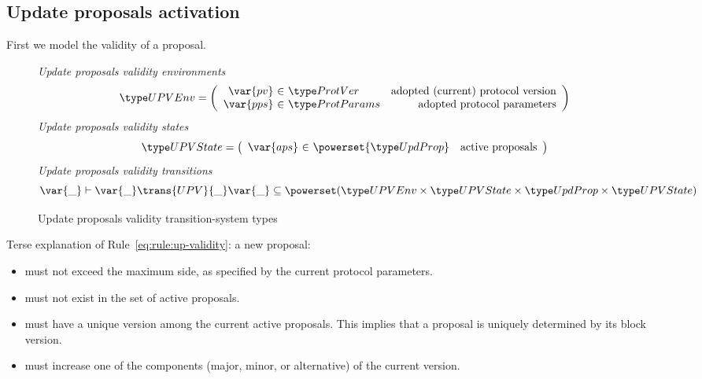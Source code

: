 \subsection{Update proposals activation}
\label{sec:update-proposals-activation}

First we model the validity of a proposal.

\begin{figure}[htb]
  \emph{Update proposals validity environments}
  \begin{equation*}
    \UPVEnv =
    \left(
      \begin{array}{r@{~\in~}lr}
        \var{pv} & \ProtVer & \text{adopted (current) protocol version}\\
        \var{pps} & \ProtParams & \text{adopted protocol parameters}\\
      \end{array}
    \right)
  \end{equation*}
  \emph{Update proposals validity states}
  \begin{equation*}
    \UPVState
    = \left(
      \begin{array}{r@{~\in~}lr}
        \var{aps} & \powerset{\UpdProp} & \text{active proposals}\\
      \end{array}
    \right)
  \end{equation*}
  \emph{Update proposals validity transitions}
    \begin{equation*}
    \var{\_} \vdash
    \var{\_} \trans{UPV}{\_} \var{\_}
    \subseteq \powerset (\UPVEnv \times \UPVState \times \UpdProp \times \UPVState)
  \end{equation*}
  \caption{Update proposals validity transition-system types}
  \label{fig:ts-types:up-validity}
\end{figure}

Terse explanation of Rule~\ref{eq:rule:up-validity}: a new proposal:
\begin{itemize}
\item must not exceed the maximum side, as specified by the current
  protocol parameters.
\item must not exist in the set of active proposals.
\item must have a unique version among the current active proposals. This
  implies that a proposal is uniquely determined by its block version.
\item must increase one of the components (major, minor, or alternative) of the
  current version.
\end{itemize}

